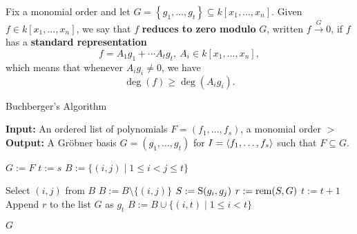 \begin{definition}\label{def:reduces_to_zero} %
    Fix a monomial order and let $G = \left\{g_1, \ldots , g_t\right\} \subseteq k[x_1, \ldots , x_n]$.
    Given $f \in k[x_1, \ldots , x_n]$, we say that $f$ \textbf{reduces to zero modulo} $G$, written $f \xrightarrow{G} 0$,
    if $f$ has a \textbf{standard representation}
    \[ f = A_1g_1 + \cdots A_tg_t,\ A_i \in k[x_1, \ldots , x_n],\]
    which means that whenever $A_ig_i \neq 0$, we have
    \[\operatorname{deg}(f) \geq \operatorname{deg}(A_ig_i).\]
\end{definition}

\begin{algorithm} %
    \caption{Buchberger's Algorithm}
    \label{alg:buchberger_list}
    \begin{algorithmic}[1]
    \Statex \textbf{Input:} An ordered list of polynomials $F = (f_1, \dots, f_s)$, a monomial order $>$
    \Statex \textbf{Output:} A Gr{\"o}bner basis $G = (g_1, \dots, g_t)$ for $I = \langle f_1, \dots, f_s \rangle$ such that $F \subseteq G$.
    
    \State $G := F$ 
    \State $t := s$ 
    \State $B := \{(i, j) \mid 1 \le i < j \le t\}$ 
    
        \State Select $(i, j)$ from $B$
        \State $B := B \setminus \{(i, j)\}$
        \State $S := \operatorname{S}(g_i, g_j)$ 
        \State $r := \operatorname{rem}(S, G)$ 
            \State $t := t + 1$
            \State Append $r$ to the list $G$ as $g_t$ 
            \State $B := B \cup \{(i, t) \mid 1 \le i < t\}$ 
        \EndIf
    \EndWhile
    
    \State \Return $G$
    \end{algorithmic}
\end{algorithm}